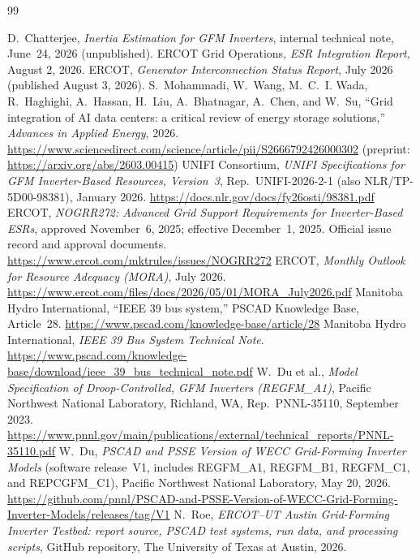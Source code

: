 \documentclass[11pt]{article}
\begin{document}
\begin{thebibliography}{99}
\setlength{\itemsep}{2pt}
\raggedright
{} D.~Chatterjee, \emph{Inertia Estimation
for GFM Inverters}, internal technical note, June~24, 2026
(unpublished).
 ERCOT Grid Operations, \emph{ESR Integration
Report}, August 2, 2026.
 ERCOT, \emph{Generator Interconnection Status
Report}, July 2026 (published August 3, 2026).
 S.~Mohammadi, W.~Wang, M.~C.~I. Wada,
R.~Haghighi, A.~Hassan, H.~Liu, A.~Bhatnagar, A.~Chen, and W.~Su,
``Grid integration of AI data centers: a critical review of energy
storage solutions,'' \emph{Advances in Applied Energy}, 2026.
\url{https://www.sciencedirect.com/science/article/pii/S2666792426000302}
(preprint: \url{https://arxiv.org/abs/2603.00415})
 UNIFI Consortium, \emph{UNIFI Specifications for
GFM Inverter-Based Resources, Version~3},
Rep.~UNIFI-2026-2-1 (also NLR/TP-5D00-98381), January 2026.
\url{https://docs.nlr.gov/docs/fy26osti/98381.pdf}
 ERCOT, \emph{NOGRR272: Advanced Grid Support Requirements for Inverter-Based ESRs}, approved November~6, 2025; effective December~1, 2025. Official issue record and approval documents. \url{https://www.ercot.com/mktrules/issues/NOGRR272}
 ERCOT, \emph{Monthly Outlook for Resource Adequacy
(MORA)}, July 2026.
\url{https://www.ercot.com/files/docs/2026/05/01/MORA_July2026.pdf}
 Manitoba Hydro International, ``IEEE 39 bus
system,'' PSCAD Knowledge Base, Article~28.
\url{https://www.pscad.com/knowledge-base/article/28}
 Manitoba Hydro International, \emph{IEEE 39 Bus
System Technical Note}.
\url{https://www.pscad.com/knowledge-base/download/ieee_39_bus_technical_note.pdf}
 W.~Du et al., \emph{Model Specification of
Droop-Controlled, GFM Inverters (REGFM\_A1)}, Pacific
Northwest National Laboratory, Richland, WA, Rep.~PNNL-35110,
September 2023. \url{https://www.pnnl.gov/main/publications/external/technical_reports/PNNL-35110.pdf}
 W.~Du, \emph{PSCAD and PSSE Version of WECC
Grid-Forming Inverter Models} (software release~V1, includes
REGFM\_A1, REGFM\_B1, REGFM\_C1, and REPCGFM\_C1), Pacific Northwest National
Laboratory, May 20, 2026.
\url{https://github.com/pnnl/PSCAD-and-PSSE-Version-of-WECC-Grid-Forming-Inverter-Models/releases/tag/V1}
 N.~Roe, \emph{ERCOT--UT Austin Grid-Forming Inverter Testbed: report source, PSCAD test systems, run data, and processing scripts}, GitHub repository, The University of Texas at Austin, 2026.

\end{thebibliography}
\end{document}
